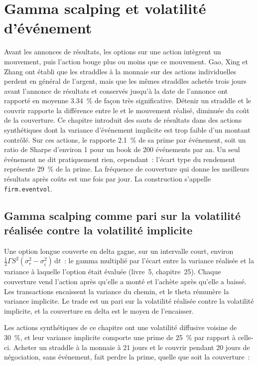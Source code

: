 \chapter{Gamma scalping et volatilité d'événement}\label{ch:s2:gamma-scalping-and-event-volatility}

Avant les annonces de résultats, les options sur une action intègrent un mouvement, puis l'action bouge plus ou moins que ce mouvement. Gao, Xing et Zhang ont établi que les straddles à la monnaie
sur des actions individuelles perdent en général de l'argent, mais que les mêmes straddles achetés trois jours avant l'annonce de résultats et conservés jusqu'à la
date de l'annonce ont rapporté en moyenne 3.34~\% de façon très significative. Détenir un straddle et le couvrir rapporte la différence entre le  et le
mouvement réalisé, diminuée du coût de la couverture. Ce chapitre introduit des sauts de résultats dans des actions synthétiques dont la variance d'événement implicite est trop faible
d'un montant contrôlé. Sur ces actions, le  rapporte 2.1~\% de sa prime par événement, soit un ratio de Sharpe d'environ 1 pour un book de 200 événements par an.
Un seul événement ne dit pratiquement rien, cependant~: l'écart type du rendement représente 29~\% de la prime. La fréquence de couverture qui donne les meilleurs résultats après coûts
est une fois par jour. La construction s'appelle \texttt{firm.eventvol}.

\section{Gamma scalping comme pari sur la volatilité réalisée contre la volatilité implicite}

Une option longue couverte en delta gagne, sur un intervalle court, environ $\tfrac12\Gamma S^2(\sigma_r^2 - \sigma_i^2)\,\mathrm{d}t$~: le gamma multiplié par
l'écart entre la variance réalisée et la variance à laquelle l'option était évaluée (livre~5, chapitre~25). Chaque couverture vend l'action après qu'elle a monté
et l'achète après qu'elle a baissé. Les transactions encaissent la variance du chemin, et le theta rémunère la variance implicite. Le trade est un pari sur la volatilité réalisée
contre la volatilité implicite, et la couverture en delta est le moyen de l'encaisser.

Les actions synthétiques de ce chapitre ont une volatilité diffusive voisine de 30~\%, et leur variance implicite comporte une prime de 25~\% par rapport à celle-ci. Acheter un
straddle à la monnaie à 21 jours et le couvrir pendant 20 jours de négociation, sans événement, fait perdre la prime, quelle que soit la couverture~:

